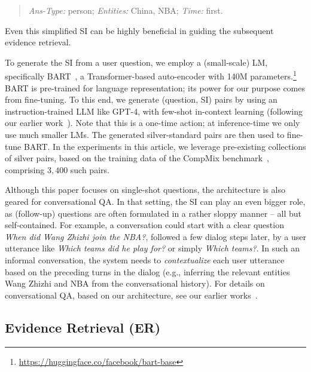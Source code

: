 \begin{quote}
{\em Ans-Type:} person; {\em Entities:} China, NBA; {\em Time:} first.
\end{quote}

\noindent Even this simplified SI can be highly beneficial in guiding the subsequent evidence retrieval.

To generate the SI from a user question, we employ a (small-scale) LM, specifically BART~\cite{DBLP:conf/acl/LewisLGGMLSZ20}, a Transformer-based auto-encoder with 140M parameters.\footnote{\url{https://huggingface.co/facebook/bart-base}}
BART is pre-trained for language representation; its power for our purpose comes from fine-tuning.
To this end, we generate (question, SI) pairs by using an instruction-trained LLM like GPT-4, with few-shot in-context learning (following our earlier work~\cite{Jia-FAITH:WWW2024}). 
Note that this is a one-time action; at inference-time we only use much smaller LMs.
The generated silver-standard pairs are then used to fine-tune BART.
In the experiments in this article, we leverage pre-existing collections of silver pairs, based on the training data of the CompMix benchmark~\cite{Christmann-CompMix:WWW2024}, 
comprising $3{,}400$ such pairs.


Although this paper focuses on single-shot questions, the \method architecture is also geared for conversational QA. In that setting, the SI can play an even bigger role, as (follow-up) questions are often formulated in a rather sloppy manner -- all but self-contained. For example, a conversation could start with a clear question {\em When did Wang Zhizhi join the NBA?}, followed a few dialog steps later, by a user utterance like {\em Which teams did he play for?} or simply {\em Which teams?}.
In such an informal conversation, the system needs to {\em contextualize} each user utterance based on the preceding turns in the dialog (e.g., inferring the relevant entities Wang Zhizhi and NBA from the conversational history).
For details on conversational QA, based on our architecture, see our earlier works~\cite{Christmann-CONVINSE:SIGIR2022,Christmann-Explaignn:SIGIR2023}.







\subsection{Evidence Retrieval (ER)}

